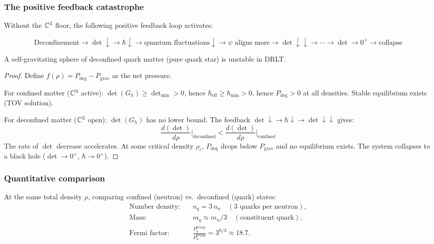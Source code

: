 \subsubsection{The positive feedback catastrophe}

Without the $\mathbb{C}^3$ floor, the following positive feedback loop activates:

\begin{equation}
\text{Deconfinement} \to \det \downarrow \to \hbar \downarrow \to \text{quantum fluctuations} \downarrow \to \psi\text{ aligns more} \to \det \downarrow\downarrow \to \cdots \to \det \to 0^+ \to \text{collapse}
\end{equation}

\begin{theorem}
\label{thm:quark_unstable}
A self-gravitating sphere of deconfined quark matter (pure quark star) is unstable in DRLT.
\end{theorem}

\begin{proof}
Define $f(\rho) = P_\text{deg} - P_\text{grav}$ as the net pressure.

For confined matter ($\mathbb{C}^3$ active):
$\det(G_h) \geq \det_\text{min} > 0$, hence $\hbar_\text{eff} \geq \hbar_\text{min} > 0$, hence $P_\text{deg} > 0$ at all densities. Stable equilibrium exists (TOV solution).

For deconfined matter ($\mathbb{C}^5$ open):
$\det(G_h)$ has no lower bound. The feedback $\det \downarrow \to \hbar \downarrow \to \det \downarrow\downarrow$ gives:
\begin{equation}
\frac{d(\det)}{d\rho}\bigg|_\text{deconfined} < \frac{d(\det)}{d\rho}\bigg|_\text{confined}
\end{equation}
The rate of $\det$ decrease accelerates. At some critical density $\rho_c$, $P_\text{deg}$ drops below $P_\text{grav}$ and no equilibrium exists. The system collapses to a black hole ($\det \to 0^+$, $\hbar \to 0^+$).
\end{proof}

\subsubsection{Quantitative comparison}

At the same total density $\rho$, comparing confined (neutron) vs.\ deconfined (quark) states:
\begin{align}
\text{Number density:} &\quad n_q = 3\,n_n \quad (\text{3 quarks per neutron}), \\
\text{Mass:} &\quad m_q \approx m_n/3 \quad (\text{constituent quark}), \\
\text{Fermi factor:} &\quad \frac{P_q^\text{Fermi}}{P_n^\text{Fermi}} = 3^{8/3} \approx 18.7.
\end{align}

